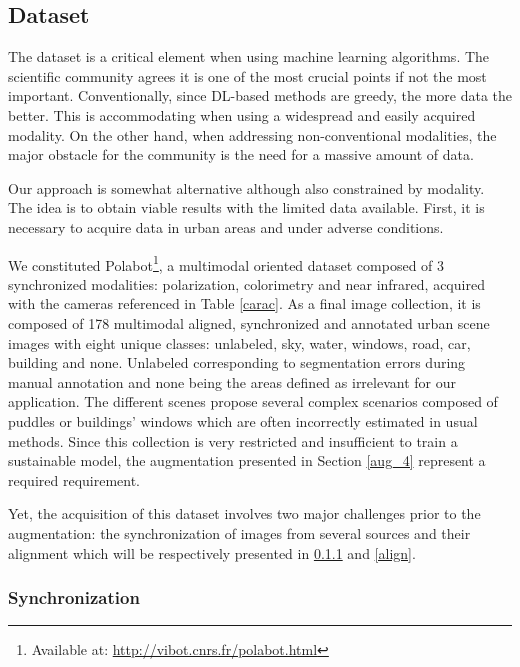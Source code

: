 \subsection{Dataset}\label{data_pol}

The dataset is a critical element when using machine learning algorithms. The scientific community agrees it is one of the most crucial points if not the most important.
Conventionally, since DL-based methods are greedy, the more data the better. This is accommodating when using a widespread and easily acquired modality. On the other hand, when addressing non-conventional modalities, the major obstacle for the community is the need for a massive amount of data.

Our approach is somewhat alternative although also constrained by modality. The idea is to obtain viable results with the limited data available.
First, it is necessary to acquire data in urban areas and under adverse conditions.

We constituted Polabot\footnote{Available at: \url{http://vibot.cnrs.fr/polabot.html}}, a multimodal oriented dataset composed of 3 synchronized modalities: polarization, colorimetry and near infrared, acquired with the cameras referenced in Table \ref{carac}. 
As a final image collection, it is composed of 178 multimodal aligned, synchronized and annotated urban scene images with eight unique classes: unlabeled, sky, water, windows, road, car, building and none. Unlabeled corresponding to segmentation errors during manual annotation and none being the areas defined as irrelevant for our application. The different scenes propose several complex scenarios composed of puddles or buildings' windows which are often incorrectly estimated in usual methods.
Since this collection is very restricted and insufficient to train a sustainable model, the augmentation presented in Section \ref{aug_4} represent a required requirement.

Yet, the acquisition of this dataset involves two major challenges prior to the augmentation: the synchronization of images from several sources and their alignment which will be respectively presented in \ref{sync} and \ref{align}.

\subsubsection{Synchronization}\label{sync}


